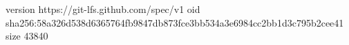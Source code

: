 version https://git-lfs.github.com/spec/v1
oid sha256:58a326d538d6365764fb9847db873fce3bb534a3e6984cc2bb1d3c795b2cee41
size 43840
